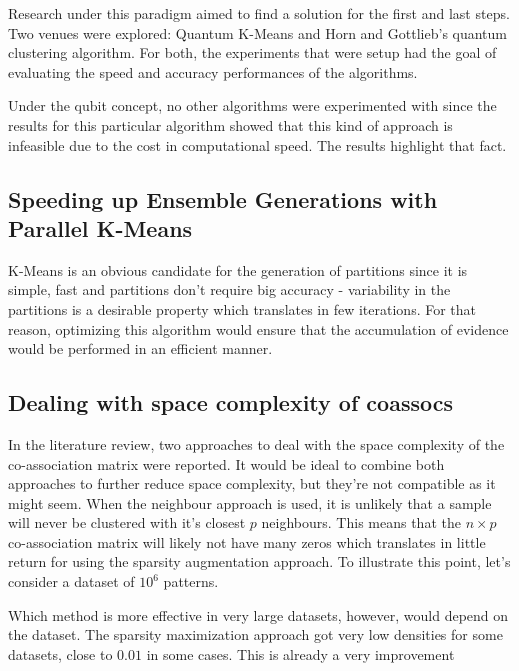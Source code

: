Research under this paradigm aimed to find a solution for the first and last steps. Two venues were explored: Quantum K-Means and Horn and Gottlieb's quantum clustering algorithm.
For both, the experiments that were setup had the goal of evaluating the speed and accuracy performances of the algorithms.

Under the qubit concept, no other algorithms were experimented with since the results for this particular algorithm showed that this kind of approach is infeasible due to the cost in computational speed. The results highlight that fact.



\subsection{Speeding up Ensemble Generations with Parallel K-Means}
K-Means is an obvious candidate for the generation of partitions since it is simple, fast and partitions don't require big accuracy - variability in the partitions is a desirable property which translates in few iterations. For that reason, optimizing this algorithm would ensure that the accumulation of evidence would be performed in an efficient manner.




\subsection{Dealing with space complexity of coassocs}
In the literature review, two approaches to deal with the space complexity of the co-association matrix were reported. It would be ideal to combine both approaches to further reduce space complexity, but they're not compatible as it might seem. When the neighbour approach is used, it is unlikely that a sample will never be clustered with it's closest $p$ neighbours. This means that the $n \times p$ co-association matrix will likely not have many zeros which translates in little return for using the sparsity augmentation approach. To illustrate this point, let's consider a dataset of $10^6$ patterns. 


Which method is more effective in very large datasets, however, would depend on the dataset. The sparsity maximization approach got very low densities for some datasets, close to $0.01$ in some cases. This is already a very improvement

